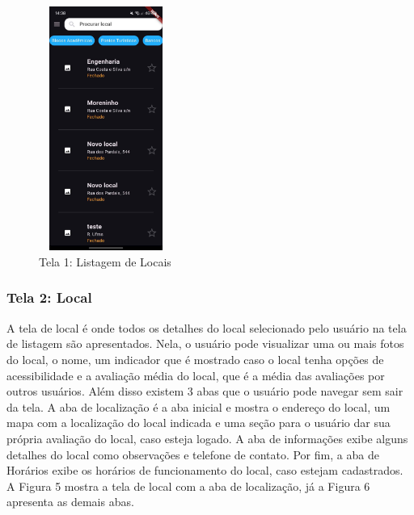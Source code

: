     \begin{figure}[h]
        \centering
        \includegraphics[width=44mm,height=80mm]{imagens/inicial.jpg}
        \caption{\scriptsize Tela 1: Listagem de Locais}
        \footnotesize  {}
        \label{fig:tela1}
    \end{figure}

    \FloatBarrier

\subsubsection{Tela 2: Local}

    A tela de local é onde todos os detalhes do local selecionado pelo usuário na tela de listagem são apresentados. Nela, o usuário pode visualizar uma ou mais fotos do local, o nome, um indicador que é mostrado caso o local tenha opções de acessibilidade e a avaliação média do local, que é a média das avaliações por outros usuários. Além disso existem 3 abas que o usuário pode navegar sem sair da tela. A aba de localização é a aba inicial e mostra o endereço do local, um mapa com a localização do local indicada e uma seção para o usuário dar sua própria avaliação do local, caso esteja logado. A aba de informações exibe alguns detalhes do local como observações e telefone de contato. Por fim, a aba de Horários exibe os horários de funcionamento do local, caso estejam cadastrados. A Figura 5 mostra a tela de local com a aba de localização, já a Figura 6 apresenta as demais abas.

